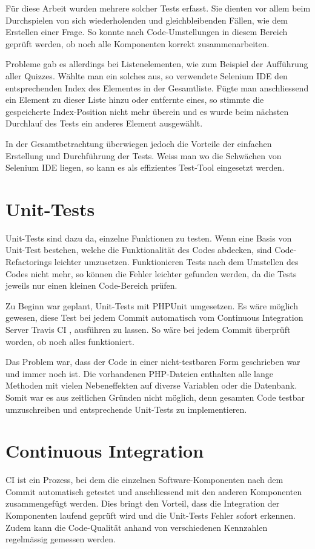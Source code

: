 Für diese Arbeit wurden mehrere solcher Tests erfasst. Sie dienten vor allem beim Durchspielen von sich wiederholenden und gleichbleibenden Fällen, wie dem Erstellen einer Frage. So konnte nach Code-Umstellungen in diesem Bereich geprüft werden, ob noch alle Komponenten korrekt zusammenarbeiten.

Probleme gab es allerdings bei Listenelementen, wie zum Beispiel der Aufführung aller Quizzes. Wählte man ein solches aus, so verwendete Selenium IDE den entsprechenden Index des Elementes in der Gesamtliste. Fügte man anschliessend ein Element zu dieser Liste hinzu oder entfernte eines, so stimmte die gespeicherte Index-Position nicht mehr überein und es wurde beim nächsten Durchlauf des Tests ein anderes Element ausgewählt.

In der Gesamtbetrachtung überwiegen jedoch die Vorteile der einfachen Erstellung und Durchführung der Tests. Weiss man wo die Schwächen von Selenium IDE liegen, so kann es als effizientes Test-Tool eingesetzt werden.


\section{Unit-Tests}
Unit-Tests sind dazu da, einzelne Funktionen zu testen. Wenn eine Basis von Unit-Test bestehen, welche die Funktionalität des Codes abdecken, sind Code-\gls{Refactoring}s leichter umzusetzen. Funktionieren Tests nach dem Umstellen des Codes nicht mehr, so können die Fehler leichter gefunden werden, da die Tests jeweils nur einen kleinen Code-Bereich prüfen.

Zu Beginn war geplant, Unit-Tests mit PHPUnit \cite{phpunit} umgesetzen. Es wäre möglich gewesen, diese Test bei jedem \gls{Commit} automatisch vom Continuous Integration Server Travis CI \cite{travisCI}, ausführen zu lassen. So wäre bei jedem Commit überprüft worden, ob noch alles funktioniert.

Das Problem war, dass der Code in einer nicht-testbaren Form geschrieben war und immer noch ist. Die vorhandenen PHP-Dateien enthalten alle lange Methoden mit vielen Nebeneffekten auf diverse Variablen oder die Datenbank. Somit war es aus zeitlichen Gründen nicht möglich, denn gesamten Code testbar umzuschreiben und entsprechende Unit-Tests zu implementieren.



\section{Continuous Integration}
\acrfull{CI} ist ein Prozess, bei dem die einzelnen Software-Komponenten nach dem \gls{Commit} automatisch getestet und anschliessend mit den anderen Komponenten zusammengefügt werden. Dies bringt den Vorteil, dass die Integration der Komponenten laufend geprüft wird und die Unit-Tests Fehler sofort erkennen. Zudem kann die Code-Qualität anhand von verschiedenen Kennzahlen regelmässig gemessen werden.


